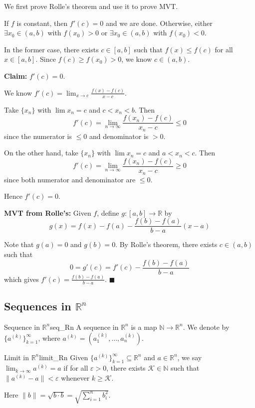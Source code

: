 \documentclass[11pt, letterpaper, openany]{book}
\renewenvironment{proof}[1][\proofname]{%
  \tcolorbox[blanker, breakable, left=1em,
    before skip=1em, after skip=1em,
    borderline west={2pt}{0pt}{MagicTeal!50},
    colback=MagicCream,
    before upper={\textcolor{MagicTeal}{\sffamily\bfseries #1.}\space}
  ]%
}{%
  \hfill\textcolor{MagicTeal}{\ensuremath{\blacksquare}}\endtcolorbox%
}
\begin{document}
\begin{proof}
We first prove Rolle's theorem and use it to prove MVT.

If $f$ is constant, then $f'(c) = 0$ and we are done. Otherwise, either $\exists x_0 \in (a,b)$ with $f(x_0) > 0$ or $\exists x_0 \in (a,b)$ with $f(x_0) < 0$.

In the former case, there exists $c \in [a,b]$ such that $f(x) \leq f(c)$ for all $x \in [a,b]$. Since $f(c) \geq f(x_0) > 0$, we know $c \in (a,b)$.

\textbf{Claim:} $f'(c) = 0$.

We know $f'(c) = \lim_{x \to c} \frac{f(x) - f(c)}{x - c}$.

Take $\{x_n\}$ with $\lim x_n = c$ and $c < x_n < b$. Then 
\[f'(c) = \lim_{n\to\infty} \frac{f(x_n) - f(c)}{x_n - c} \leq 0\]
since the numerator is $\leq 0$ and denominator is $> 0$.

On the other hand, take $\{x_n\}$ with $\lim x_n = c$ and $a < x_n < c$. Then
\[f'(c) = \lim_{n\to\infty} \frac{f(x_n) - f(c)}{x_n - c} \geq 0\]
since both numerator and denominator are $\leq 0$.

Hence $f'(c) = 0$.

\textbf{MVT from Rolle's:} Given $f$, define $g:[a,b]\to\mathbb{R}$ by
\[g(x) = f(x) - f(a) - \frac{f(b) - f(a)}{b - a}(x - a)\]

Note that $g(a) = 0$ and $g(b) = 0$. By Rolle's theorem, there exists $c \in (a,b)$ such that
\[0 = g'(c) = f'(c) - \frac{f(b) - f(a)}{b - a}\]
which gives $f'(c) = \frac{f(b) - f(a)}{b - a}$.
\end{proof}

\subsection{Sequences in $\mathbb{R}^n$}

\begin{defn}{Sequence in $\mathbb{R}^n$}{seq_Rn}
A sequence in $\mathbb{R}^n$ is a map $\mathbb{N} \to \mathbb{R}^n$. We denote by $\{a^{(k)}\}_{k=1}^\infty$, where $a^{(k)} = (a_1^{(k)}, \ldots, a_n^{(k)})$.
\end{defn}

\begin{defn}{Limit in $\mathbb{R}^n$}{limit_Rn}
Given $\{a^{(k)}\}_{k=1}^\infty \subseteq \mathbb{R}^n$ and $a \in \mathbb{R}^n$, we say $\lim_{k\to\infty} a^{(k)} = a$ if for all $\varepsilon > 0$, there exists $\mathcal{K} \in \mathbb{N}$ such that $\|a^{(k)} - a\| < \varepsilon$ whenever $k \geq \mathcal{K}$.

Here $\|b\| = \sqrt{b \cdot b} = \sqrt{\sum_{i=1}^n b_i^2}$.
\end{defn}
\end{document}
